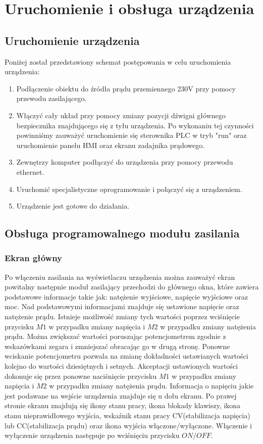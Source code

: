 \documentclass[oneside]{mgr}
\begin{document}
\section{Uruchomienie i obsługa urządzenia}
\subsection{Uruchomienie urządzenia}
Poniżej został przedstawiony schemat postępowania w celu uruchomienia urządzenia:
\begin{enumerate}
    \item Podłączenie obiektu do źródła prądu przemiennego 230V przy pomocy przewodu zasilającego.
    \item Włączyć cały układ przy pomocy zmiany pozycji dźwigni głównego bezpiecznika  znajdującego się z tyłu urządzenia. Po wykonaniu tej czynności powinniśmy zauważyć uruchomienie się sterownika PLC w tryb "run" oraz uruchomienie panelu HMI oraz ekranu zadajnika prądowego.
    \item Zewnętrzy komputer podłączyć do urządzenia przy pomocy przewodu ethernet.
    \item Uruchomić specjalistyczne oprogramowanie i połączyć się z urządzeniem.
    \item Urządzenie jest gotowe do działania.
\end{enumerate}

\subsection{Obsługa programowalnego modułu zasilania}
\subsubsection{Ekran główny}
Po włączeniu zasilania na wyświetlaczu urządzenia można zauważyć ekran powitalny następnie moduł zasilający przechodzi do głównego okna, które zawiera podstawowe informacje takie jak: natężenie wyjściowe, napięcie wyjściowe oraz moc. Nad podstawowymi informacjami znajduje się ustawione napięcie oraz natężenie prądu. Istnieje możliwość zmiany tych wartości poprzez wciśnięcie przycisku $M1$ w przypadku zmiany napięcia i $M2$ w przypadku zmiany natężenia prądu. Można zwiększać wartości poruszając potencjometrem zgodnie z wskazówkami zegara i zmniejszać obracając go w drugą stronę. Ponowne wciskanie potencjometru pozwala na zmianę dokładności ustawianych wartości kolejno do wartości dziesiętnych i setnych. Akceptacji ustawionych wartości dokonuje się przez ponowne naciśnięcie przycisku $M1$ w przypadku zmiany napięcia i $M2$ w przypadku zmiany natężenia prądu. Informacja o napięciu jakie jest podawane na wejście urządzenia znajduje się u dołu ekranu. Po prawej stronie ekranu znajdują się ikony stanu pracy, ikona blokady klawiszy, ikona stanu nieprawidłowego wyjścia, wskaźnik stanu pracy CV(stabilizacja napięcia) lub CC(stabilizacja prądu) oraz ikona wyjścia włączone/wyłączone. Włączenie i wyłączenie urządzenia następuje po wciśnięciu przycisku $ON/OFF$.
\end{document}
